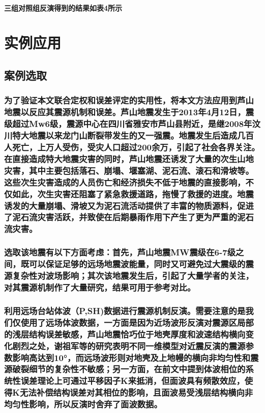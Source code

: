 \documentclass[a4paper,12pt,single,pdftex]{scrartcl}
\begin{document}
\label{ID_1845269170}\paragraph{三组对照组反演得到的结果如表4所示}

\label{ID_1368135373}\paragraph{}

\label{ID_89289087}\section{实例应用}

\label{ID_1189436416}\subsection{案例选取}

\label{ID_887518159}\subsubsection{为了验证本文联合定权和误差评定的实用性，将本文方法应用到芦山地震以反应其震源机制和误差。芦山地震发生于2013年4月12日，震级超过Mw6级，震源中心在四川省雅安市芦山县附近，是继2008年汶川特大地震以来龙门山断裂带发生的又一强震。地震发生后造成几百人死亡，上万人受伤，受灾人口超过200余万\citep{崔鹏2013}，引起了社会各界关注。在直接造成特大地震灾害的同时，芦山地震还诱发了大量的次生山地灾害，其中主要包括落石、崩塌、堰塞湖、泥石流、滚石和滑坡等\citep{陈晓清2013}。这些次生灾害造成的人员伤亡和经济损失不低于地震的直接影响，不仅如此，次生灾害还阻塞了紧急救援道路，拖慢了救援的进度。地震诱发的大量崩塌、滑坡又为泥石流活动提供了丰富的物质源料，促进了泥石流灾害活跃，并致使在后期暴雨作用下产生了更为严重的泥石流灾害。}

\label{ID_197380368}\subsubsection{选取该地震有以下方面考虑：首先，芦山地震MW震级在6-7级之间，既可以保证足够的远场地震波能量，同时又可避免过大震级的震源复杂性对波场影响；其次该地震发生后，引起了大量学者的关注，对其震源机制作了大量研究，结果可用于参考对比。}

\label{ID_465668819}\subsubsection{利用远场台站体波（P,SH)数据进行震源机制反演。需要注意的是我们仅使用了远场体波数据，一方面是因为近场波形反演对震源区局部的浅层结构误差敏感，芦山地震恰巧位于地壳厚度和波速结构横向变化剧烈之处，谢祖军等的研究表明不同一维模型对近震反演的震源参数影响高达到10°，而远场波形则对地壳及上地幔的横向非均匀性和震源破裂细节的复杂性不敏感；另一方面，在前文中提到体波相位的系统性误差理论上可通过平移因子K来抵消，但面波具有频散效应，使得K无法补偿结构误差对其相位的影响，且面波易受浅层结构横向非均匀性影响，所以反演时舍弃了面波数据。}
\end{document}
